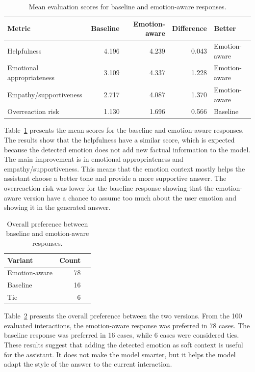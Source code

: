 \begin{table}[h]
    \centering
    \begin{tabular}{lrrrl}
        \hline
        Metric & Baseline & Emotion-aware & Difference & Better \\
        \hline
        Helpfulness & 4.196 & 4.239 & 0.043 & Emotion-aware \\
        Emotional appropriateness & 3.109 & 4.337 & 1.228 & Emotion-aware \\
        Empathy/supportiveness & 2.717 & 4.087 & 1.370 & Emotion-aware \\
        Overreaction risk & 1.130 & 1.696 & 0.566 & Baseline \\
        \hline
    \end{tabular}
    \caption{Mean evaluation scores for baseline and emotion-aware responses.}
    \label{tab:emotion-flow-metric-summary}
\end{table}

 Table~\ref{tab:emotion-flow-metric-summary} presents the mean scores for the baseline and emotion-aware responses. The results show that the helpfulness have a similar score, which is expected because the detected emotion does not add new factual information to the model. The main improvement is in emotional appropriateness and empathy/supportiveness. This means that the emotion context mostly helps the assistant choose a better tone and provide a more supportive answer. The overreaction risk was lower for the baseline response showing that the emotion-aware version have a chance to assume too much about the user emotion and showing it in the generated answer.

\begin{table}[h]
    \centering
    \begin{tabular}{lrr}
        \hline
        Variant & Count \\
        \hline
        Emotion-aware & 78 \\
        Baseline & 16 \\
        Tie & 6 \\
        \hline
    \end{tabular}
    \caption{Overall preference between baseline and emotion-aware responses.}
    \label{tab:emotion-flow-overall-preference}
\end{table}


Table~\ref{tab:emotion-flow-overall-preference} presents the overall preference between the two versions. From the 100 evaluated interactions, the emotion-aware response was preferred in 78 cases. The baseline response was preferred in 16 cases, while 6 cases were considered ties. These results suggest that adding the detected emotion as soft context is useful for the assistant. It does not make the model smarter, but it helps the model adapt the style of the answer to the current interaction.
